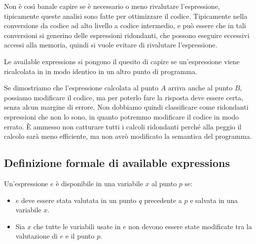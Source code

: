 Non è così banale capire se è necessario o meno rivalutare l'espressione, tipicamente queste analisi 
sono fatte per ottimizzare il codice. Tipicamente nella conversione da codice ad alto livello a codice
intermedio, e può essere che in tali conversioni si generino delle espressioni ridondanti, che possono
eseguire eccessivi accessi alla memoria, quindi si vuole evitare di rivalutare l'espressione.

Le available expressions si pongono il quesito di capire se un'espressione
viene ricalcolata in in modo identico in un altro punto di programma.

Se dimostriamo che l'espressione calcolata al punto $A$ arriva anche al punto $B$, possiamo 
modificare il codice, ma per poterlo fare la risposta deve essere certa, senza alcun margine di errore.
Non dobbiamo quindi classificare come ridondanti espressioni che non lo sono, in quanto potremmo
modificare il codice in modo errato.
È ammesso non catturare tutti i calcoli ridondanti perché alla peggio il calcolo sarà meno efficiente, 
ma non avrò modificato la semantica del programma.
\subsection{Definizione formale di available expressions}
\begin{tcolorbox}[title = Espressione disponibile in una variabile $x$ al punto $p$]
    Un'espressione $e$ è disponibile in una variabile $x$ al punto $p$ se:
    \begin{itemize}
        \item $e$ deve essere stata valutata in un punto $q$ precedente a $p$ e 
        salvata in una variabile $x$.
        \item Sia $x$ che tutte le variabili usate in $e$ non devono essere state modificate
        tra la valutazione di $e$ e il punto $p$.
    \end{itemize}
\end{tcolorbox}
\begin{figure}[H]
    \centering 
\end{figure}

